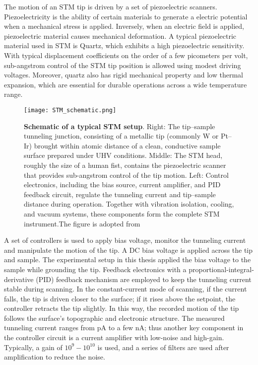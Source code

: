 The motion of an STM tip is driven by a set of piezoelectric scanners. Piezoelectricity is the ability of certain materials to generate a electric potential when a mechanical stress is applied. Inversely, when an electric field is applied, piezoelectric material causes mechanical deformation. A typical piezoelectric material used in STM is Quartz, which exhibits a high piezoelectric sensitivity. With typical displacement coefficients on the order of a few picometers per volt, sub-angstrom control of the STM tip position is allowed using modest driving voltages. Moreover, quartz also has rigid mechanical property and low thermal expansion, which are essential for durable operations across a wide temperature range.
 \begin{figure}
 	\centering
 	\texttt{[image: STM\_schematic.png]}
 	\caption[\textbf{Schematic of a typical STM setup}]{\textbf{Schematic of a typical STM setup}. Right: The tip–sample tunneling junction, consisting of a metallic tip (commonly W or Pt–Ir) brought within atomic distance of a clean, conductive sample surface prepared under UHV conditions. Middle: The STM head, roughly the size of a human fist, contains the piezoelectric scanner that provides sub-angstrom control of the tip motion. Left: Control electronics, including the bias source, current amplifier, and PID feedback circuit, regulate the tunneling current and tip–sample distance during operation. Together with vibration isolation, cooling, and vacuum systems, these components form the complete STM instrument.The figure is adopted from \cite{stuartScanningTunnellingMicroscopy2021}}
 	\label{fig:stm_schematics}
 \end{figure}
 
A set of controllers is used to apply bias voltage, monitor the tunneling current and manipulate the motion of the tip. A DC bias voltage is applied across the tip and sample. The experimental setup in this thesis applied the bias voltage to the sample while grounding the tip. Feedback electronics with a proportional-integral-derivative (PID) feedback mechanism are employed to keep the tunneling current stable during scanning. In the constant-current mode of scanning, if the current falls, the tip is driven closer to the surface; if it rises above the setpoint, the controller retracts the tip slightly. In this way, the recorded motion of the tip follows the surface's topographic and electronic structure. The measured tunneling current ranges from pA to a few nA; thus another key component in the controller circuit is a current amplifier with low-noise and high-gain. Typically, a gain of $10^9-10^{10}$ is used, and a series of filters are used after amplification to reduce the noise. 

